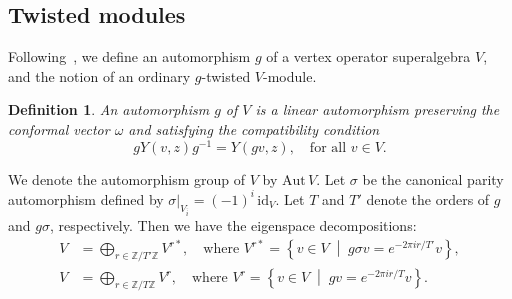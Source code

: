 \documentclass[9pt]{amsart}
\newtheorem{definition}{Definition}[section]
\begin{document}
\subsection{Twisted modules}
Following~\cite{dong2006twisted}, we define an automorphism \( g \) of a vertex operator superalgebra \( V \), and the notion of an ordinary \( g \)-twisted \( V \)-module.

\begin{definition}
An automorphism \( g \) of \( V \) is a linear automorphism preserving the conformal vector \( \omega \) and satisfying the compatibility condition
\[
g Y(v,z) g^{-1} = Y(gv, z), \quad \text{for all } v \in V.
\]
\end{definition}

We denote the automorphism group of \( V \) by \( \mathrm{Aut}\,V \). Let \( \sigma \) be the canonical parity automorphism defined by \( \sigma|_{V_{\overline{i}}} = (-1)^i \, \mathrm{id}_V \). Let \( T \) and \( T' \) denote the orders of \( g \) and \( g\sigma \), respectively. Then we have the eigenspace decompositions:
\begin{align*}
    V &= \bigoplus_{r \in \mathbb{Z}/T'\mathbb{Z}} V^{r*}, \quad \text{where } V^{r*} = \left\{ v \in V \;\middle|\; g\sigma v = e^{-2\pi i r/T'} v \right\}, \\
    V &= \bigoplus_{r \in \mathbb{Z}/T\mathbb{Z}} V^r, \quad \text{where } V^r = \left\{ v \in V \;\middle|\; gv = e^{-2\pi i r/T} v \right\}.
\end{align*}
\end{document}
